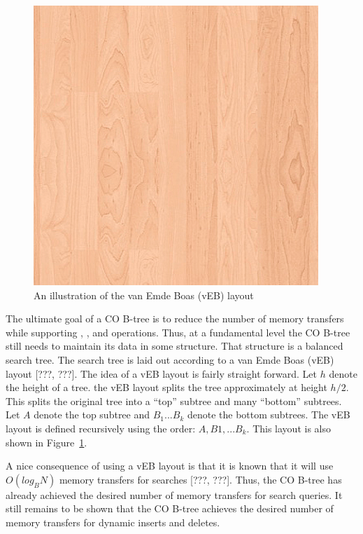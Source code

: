 \documentclass{style}
\begin{document}
\begin{figure}

\begin{center}
	\includegraphics[width=0.8\columnwidth]{figures/veb.png}
\end{center}

\caption{An illustration of the van Emde Boas (vEB) layout}
\label{fig:veb}
\end{figure}


The ultimate goal of a CO B-tree is to reduce the number of memory transfers
while supporting \Search{}, \Insert{}, and \Delete{} operations. Thus, at a
fundamental level the CO B-tree still needs to maintain its data in some
structure. That structure is a balanced search tree. The search tree is laid
out according to a van Emde Boas (vEB) layout [???, ???]. The idea of a vEB
layout is fairly straight forward. Let $h$ denote the height of a tree. the
vEB layout splits the tree approximately at height $h/2$. This splits the
original tree into a ``top'' subtree and many ``bottom'' subtrees. Let $A$
denote the top subtree and $B_1... B_k$ denote the bottom subtrees. The vEB
layout is defined recursively using the order: $A, B1, ... B_k$. This layout
is also shown in Figure~\ref{fig:veb}.

A nice consequence of using a vEB layout is that it is known that it will use
$O(log_B N)$ memory transfers for searches [???, ???]. Thus, the CO B-tree has already
achieved the desired number of memory transfers for search queries. It
still remains to be shown that the CO B-tree achieves the desired number of
memory transfers for dynamic inserts and deletes.
\end{document}

